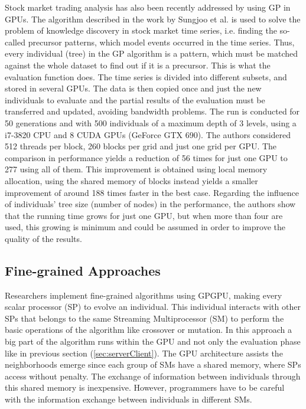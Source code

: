 \documentclass{article}
\begin{document}
Stock market trading analysis has also been recently addressed by
using GP in GPUs. The algorithm described in the work by Sungjoo et
al. \cite{Sungjoo15fastknowledge} is used to solve the problem of
knowledge discovery in stock market time series, i.e. finding the
so-called precursor patterns, which model events occurred in the time
series. Thus, every individual (tree) in the GP algorithm is a
pattern, which must be matched against the whole dataset to find
out if it is a precursor. This is what the evaluation function
does. The time series is divided into different subsets, and stored in
several GPUs. The data is then copied once and just the new
individuals to evaluate and the partial results of the evaluation must
be transferred and updated, avoiding bandwidth problems.
The run is conducted for 50 generations and with 500 individuals of a maximum depth of 3 levels, using a i7-3820 CPU and 8 CUDA GPUs (GeForce GTX 690).
The authors considered
512 threads per block, 260 blocks per grid and just one grid per
GPU. The comparison in performance yields a reduction of 56 times for
just one GPU to 277 using all of them. This improvement is obtained using
local memory allocation, using the shared memory of blocks instead
yields a smaller improvement of around 188 times faster in the best
case. Regarding the influence of individuals' tree size (number of
nodes) in the performance, the authors show that the running time
grows for just one GPU, but when more than four are used, this growing
is minimum and could be assumed in order to improve the quality of the
results. %


\subsection{Fine-grained Approaches}

Researchers implement fine-grained algorithms using GPGPU, making
every scalar processor (SP) to evolve an individual. This individual
interacts with other SPs that belongs to the same Streaming
Multiprocessor (SM) to perform the basic operations of the algorithm
like crossover or mutation. In this approach a big part of the
algorithm runs within the GPU and not only the evaluation phase like
in previous section (\ref{sec:serverClient}). The GPU architecture
assists the neighborhoods emerge since each group of SMs have a shared
memory, where SPs access without penalty. The exchange of information
between individuals through this shared memory is
inexpensive. However, programmers have to be careful with the
information exchange between individuals in different SMs.
\end{document}

